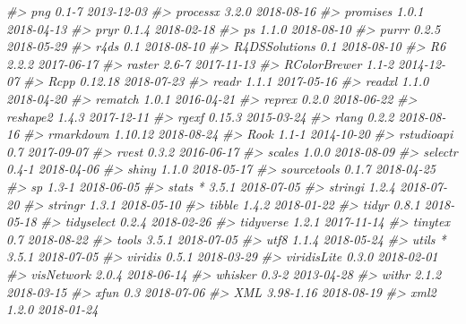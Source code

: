 \documentclass[]{book}
\newenvironment{Shaded}{\begin{snugshade}}{\end{snugshade}}
\newcommand{\CommentTok}[1]{\textcolor[rgb]{0.56,0.35,0.01}{\textit{#1}}}
\theoremstyle{plain}
\theoremstyle{remark}
\begin{document}
\begin{Shaded}
\begin{Highlighting}[]
\CommentTok{#>  png              0.1-7      2013-12-03}
\CommentTok{#>  processx         3.2.0      2018-08-16}
\CommentTok{#>  promises         1.0.1      2018-04-13}
\CommentTok{#>  pryr             0.1.4      2018-02-18}
\CommentTok{#>  ps               1.1.0      2018-08-10}
\CommentTok{#>  purrr            0.2.5      2018-05-29}
\CommentTok{#>  r4ds             0.1        2018-08-10}
\CommentTok{#>  R4DSSolutions    0.1        2018-08-10}
\CommentTok{#>  R6               2.2.2      2017-06-17}
\CommentTok{#>  raster           2.6-7      2017-11-13}
\CommentTok{#>  RColorBrewer     1.1-2      2014-12-07}
\CommentTok{#>  Rcpp             0.12.18    2018-07-23}
\CommentTok{#>  readr            1.1.1      2017-05-16}
\CommentTok{#>  readxl           1.1.0      2018-04-20}
\CommentTok{#>  rematch          1.0.1      2016-04-21}
\CommentTok{#>  reprex           0.2.0      2018-06-22}
\CommentTok{#>  reshape2         1.4.3      2017-12-11}
\CommentTok{#>  rgexf            0.15.3     2015-03-24}
\CommentTok{#>  rlang            0.2.2      2018-08-16}
\CommentTok{#>  rmarkdown        1.10.12    2018-08-24}
\CommentTok{#>  Rook             1.1-1      2014-10-20}
\CommentTok{#>  rstudioapi       0.7        2017-09-07}
\CommentTok{#>  rvest            0.3.2      2016-06-17}
\CommentTok{#>  scales           1.0.0      2018-08-09}
\CommentTok{#>  selectr          0.4-1      2018-04-06}
\CommentTok{#>  shiny            1.1.0      2018-05-17}
\CommentTok{#>  sourcetools      0.1.7      2018-04-25}
\CommentTok{#>  sp               1.3-1      2018-06-05}
\CommentTok{#>  stats          * 3.5.1      2018-07-05}
\CommentTok{#>  stringi          1.2.4      2018-07-20}
\CommentTok{#>  stringr          1.3.1      2018-05-10}
\CommentTok{#>  tibble           1.4.2      2018-01-22}
\CommentTok{#>  tidyr            0.8.1      2018-05-18}
\CommentTok{#>  tidyselect       0.2.4      2018-02-26}
\CommentTok{#>  tidyverse        1.2.1      2017-11-14}
\CommentTok{#>  tinytex          0.7        2018-08-22}
\CommentTok{#>  tools            3.5.1      2018-07-05}
\CommentTok{#>  utf8             1.1.4      2018-05-24}
\CommentTok{#>  utils          * 3.5.1      2018-07-05}
\CommentTok{#>  viridis          0.5.1      2018-03-29}
\CommentTok{#>  viridisLite      0.3.0      2018-02-01}
\CommentTok{#>  visNetwork       2.0.4      2018-06-14}
\CommentTok{#>  whisker          0.3-2      2013-04-28}
\CommentTok{#>  withr            2.1.2      2018-03-15}
\CommentTok{#>  xfun             0.3        2018-07-06}
\CommentTok{#>  XML              3.98-1.16  2018-08-19}
\CommentTok{#>  xml2             1.2.0      2018-01-24}

\end{Highlighting}
\end{Shaded}
\end{document}
